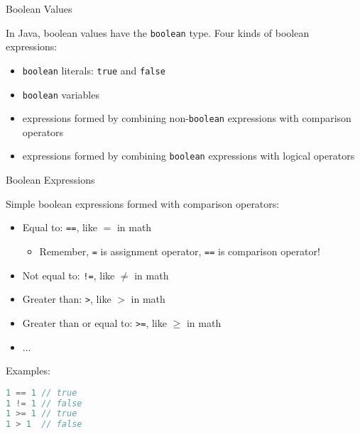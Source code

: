 \documentclass{beamer}
\begin{document}
\begin{frame}[fragile]{Boolean Values}


In Java, boolean values have the {\tt boolean} type.  Four kinds of boolean expressions:
\begin{itemize}
\item {\tt boolean} literals: {\tt true} and {\tt false}
\item {\tt boolean} variables
\item expressions formed by combining non-{\tt boolean} expressions with comparison operators
\item expressions formed by combining {\tt boolean} expressions with logical operators
\end{itemize}


\end{frame}


\begin{frame}[fragile]{Boolean Expressions}


Simple boolean expressions formed with comparison operators:
\begin{itemize}
\item Equal to: {\tt ==}, like $=$ in math
  \begin{itemize}
    \item Remember, {\tt =} is assignment operator, {\tt ==} is comparison operator!
  \end{itemize}
\item Not equal to: {\tt !=}, like $\ne$ in math
\item Greater than: {\tt >}, like $>$ in math
\item Greater than or equal to: {\tt >=}, like $\ge$ in math
\item ...
\end{itemize}
Examples:
\begin{lstlisting}[language=Java]
1 == 1 // true
1 != 1 // false
1 >= 1 // true
1 > 1  // false
\end{lstlisting}

\end{frame}
\end{document}
